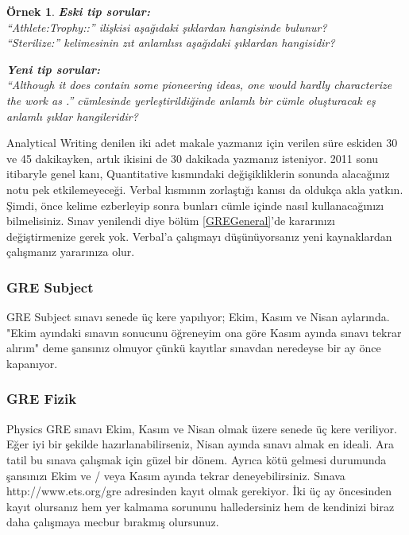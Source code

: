 \documentclass[12pt]{article}
\theoremstyle{break}
\newtheorem{ornek}{Örnek}[section]
\begin{document}
\begin{ornek}
\label{NewGREOrnek}
\textbf{Eski tip sorular:}\\
``Athlete:Trophy::'' ilişkisi aşağıdaki şıklardan hangisinde bulunur? \\
``Sterilize:'' kelimesinin zıt anlamlısı aşağıdaki şıklardan hangisidir?

\textbf{Yeni tip sorular:}\\
``Although it does contain some pioneering ideas, one would hardly characterize the work as \hspace*{1cm}.'' cümlesinde yerleştirildiğinde anlamlı bir cümle oluşturacak eş anlamlı şıklar hangileridir?
\end{ornek}

Analytical Writing denilen iki adet makale yazmanız için verilen süre eskiden 30 ve 45 dakikayken, artık ikisini de 30 dakikada yazmanız isteniyor.
2011 sonu itibaryle genel kanı, Quantitative kısmındaki değişikliklerin sonunda alacağınız notu pek etkilemeyeceği. Verbal kısmının zorlaştığı kanısı da oldukça akla yatkın. Şimdi, önce kelime ezberleyip sonra bunları cümle içinde nasıl kullanacağınızı bilmelisiniz. Sınav yenilendi diye bölüm \ref{GREGeneral}'de kararınızı değiştirmenize gerek yok. Verbal’a çalışmayı düşünüyorsanız yeni kaynaklardan çalışmanız yararınıza olur.

\subsubsection{GRE Subject}
GRE Subject sınavı senede üç kere yapılıyor; Ekim, Kasım ve Nisan aylarında. "Ekim ayındaki sınavın sonucunu öğreneyim ona göre Kasım ayında sınavı tekrar alırım" deme şansınız olmuyor çünkü kayıtlar sınavdan neredeyse bir ay önce kapanıyor.

\subsubsection{GRE Fizik}
Physics GRE sınavı Ekim, Kasım ve Nisan olmak üzere senede üç kere veriliyor. Eğer iyi bir şekilde hazırlanabilirseniz, Nisan ayında sınavı almak en ideali. Ara tatil bu sınava çalışmak için güzel bir dönem. Ayrıca kötü gelmesi durumunda şansınızı Ekim ve / veya Kasım ayında tekrar deneyebilirsiniz. Sınava http://www.ets.org/gre adresinden kayıt olmak gerekiyor. İki üç ay öncesinden kayıt olursanız hem yer kalmama sorununu halledersiniz hem de kendinizi biraz daha çalışmaya mecbur bırakmış olursunuz. 
\end{document}
